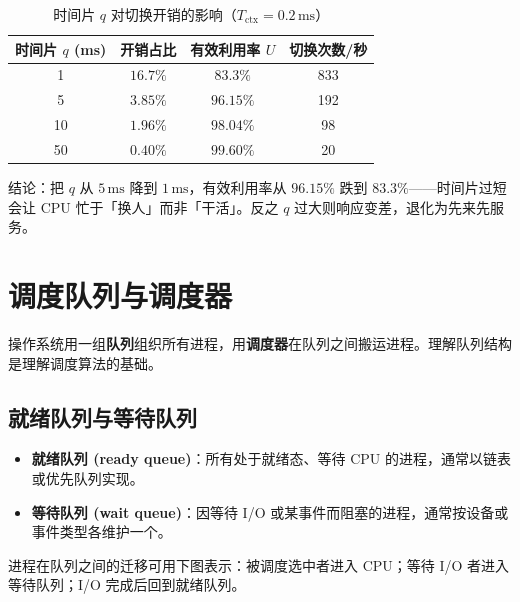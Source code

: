 \begin{table}[H]
\centering
\caption{时间片 $q$ 对切换开销的影响（$T_{\text{ctx}} = 0.2\,\text{ms}$）}
\begin{tabulary}{\textwidth}{CCCC}
\toprule
时间片 $q$ (ms) & 开销占比 & 有效利用率 $U$ & 切换次数/秒 \\
  & $16.7\%$ & $83.3\%$ & 833 \\
5  & $3.85\%$ & $96.15\%$ & 192 \\
10 & $1.96\%$ & $98.04\%$ & 98 \\
50 & $0.40\%$ & $99.60\%$ & 20 \\
\bottomrule
\end{tabulary}
\end{table}

\noindent 结论：把 $q$ 从 $5\,\text{ms}$ 降到 $1\,\text{ms}$，有效利用率从 $96.15\%$ 跌到 $83.3\%$——时间片过短会让 CPU 忙于「换人」而非「干活」。反之 $q$ 过大则响应变差，退化为先来先服务。

\section{调度队列与调度器}

\noindent 操作系统用一组\textbf{队列}组织所有进程，用\textbf{调度器}在队列之间搬运进程。理解队列结构是理解调度算法的基础。

\subsection{就绪队列与等待队列}

\begin{itemize}
    \item \textbf{就绪队列 (ready queue)}：所有处于就绪态、等待 CPU 的进程，通常以链表或优先队列实现。
    \item \textbf{等待队列 (wait queue)}：因等待 I/O 或某事件而阻塞的进程，通常按设备或事件类型各维护一个。
\end{itemize}

\noindent 进程在队列之间的迁移可用下图表示：被调度选中者进入 CPU；等待 I/O 者进入等待队列；I/O 完成后回到就绪队列。

